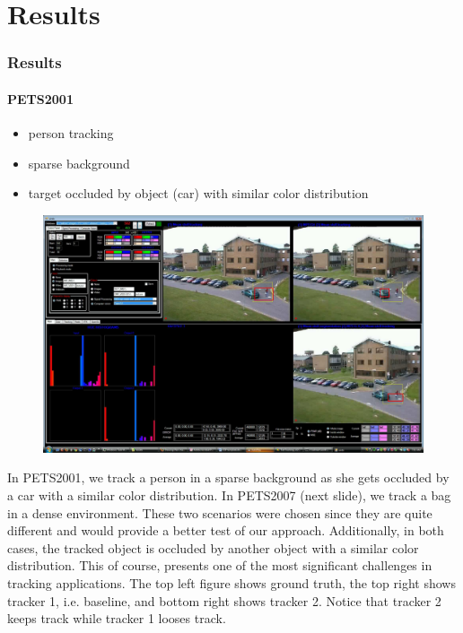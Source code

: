 \section{Results}
\begin{frame}
\frametitle{Results} 
\framesubtitle{PETS2001} 
\logoCSIPCPL\mypagenum
{}
{
	\begin{itemize}
		\item person tracking
		\item sparse background
		\item target occluded by object (car) with similar color distribution
	\end{itemize}
	\begin{figure}
		\includegraphics[width=1.0\textwidth]{figs/ICIP2009_PETS2001_FN_00592_snapshotVVG.pdf}
	\end{figure}
}
{
In PETS2001, we track a person in a sparse background as she gets occluded by a car with a similar color distribution.  In PETS2007 (next slide), we track a bag in a dense environment.  These two scenarios were chosen since they are quite different and would provide a better test of our approach.  Additionally, in both cases, the tracked object is occluded by another object with a similar color distribution.  This of course, presents one of the most significant challenges in tracking applications. 
\newline
\newline
The top left figure shows ground truth, the top right shows tracker 1, i.e. baseline, and bottom right shows tracker 2.  Notice that tracker 2 keeps track while tracker 1 looses track.
}
\end{frame}







